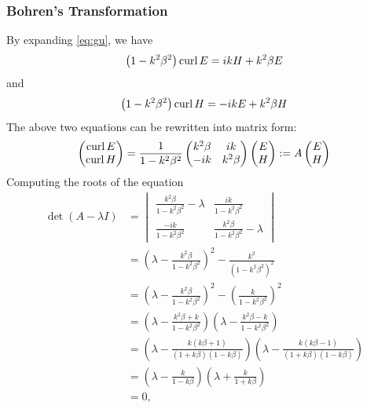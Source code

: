\subsubsection{Bohren's Transformation}
By expanding \eqref{eq:gu}, we have
\begin{align}\label{eq:maxe}
  \left(1-k^2\beta^2\right)\operatorname{curl} E = ikH + k^2\beta E
\end{align}
and
\begin{align}\label{eq:maxh}
  \left(1-k^2\beta^2\right)\operatorname{curl} H = -ikE + k^2\beta H
\end{align}
The above two equations can be rewritten into matrix form:
\begin{align*}
 \begin{pmatrix}\operatorname{curl} E \\ \operatorname{curl} H\end{pmatrix} = \frac{1}{1-k^2\beta^2}\begin{pmatrix}k^2\beta & ik \\-ik & k^2\beta\end{pmatrix}\begin{pmatrix}E \\ H\end{pmatrix} := A\begin{pmatrix}E \\ H\end{pmatrix}\end{align*}
Computing the roots of the equation
\begin{align*}
  \det(A-\lambda I) &= \begin{vmatrix}
    \frac{k^2\beta}{1-k^2\beta^2} - \lambda & \frac{ik}{1-k^2\beta^2} \\
    \frac{-ik}{1-k^2\beta^2} & \frac{k^2\beta}{1-k^2\beta^2} - \lambda
  \end{vmatrix} \\
  &= \left(\lambda-\frac{k^2\beta}{1-k^2\beta^2}\right)^2 - \frac{k^2}{(1-k^2\beta^2)^2}\\
  &= \left(\lambda-\frac{k^2\beta}{1-k^2\beta^2}\right)^2 - \left(\frac{k}{1-k^2\beta^2}\right)^2 \\
  &= \left(\lambda-\frac{k^2\beta + k}{1-k^2\beta^2}\right)\left(\lambda-\frac{k^2\beta - k}{1-k^2\beta^2}\right) \\
  &= \left(\lambda-\frac{k(k\beta + 1)}{(1+k\beta)(1-k\beta)}\right)\left(\lambda-\frac{k(k\beta-1)}{(1+k\beta)(1-k\beta)}\right) \\
  &=\left(\lambda-\frac{k}{1-k\beta}\right)\left(\lambda + \frac{k}{1+k\beta}\right)\\
  &=0,
\end{align*}
